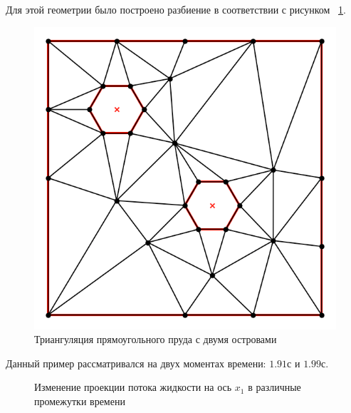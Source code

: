 \documentclass[14pt]{extreport}
\begin{document}
Для этой геометрии было построено разбиение в соответствии с рисунком ~\ref{img:ex3:mesh}.

\begin{figure}[H]
\centerline{
\includegraphics[width=0.5\linewidth]{images/ex3/mesh}}
\caption{Триангуляция прямоугольного пруда с двумя островами}
\label{img:ex3:mesh}
\end{figure}

Данный пример рассматривался на двух моментах времени: $1.91$с и $1.99$с.

\begin{figure}[H]
  \centering
  \hfill
  \caption{Изменение проекции потока жидкости на ось $x_1$ в различные промежутки времени}
\end{figure}
\end{document}

